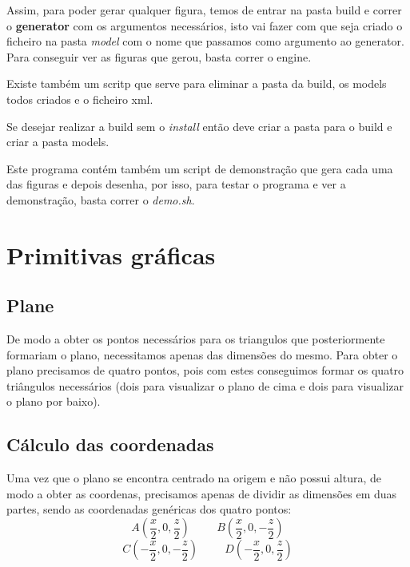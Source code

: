\Huge\documentclass{article}
\begin{document}
\vspace{0.5cm}

Assim, para poder gerar qualquer figura, temos de entrar na pasta build e correr o \textbf{generator} com os argumentos necessários, isto vai fazer com que seja criado o ficheiro na pasta \textit{model} com o nome que passamos como argumento ao generator. Para conseguir ver as figuras que gerou, basta correr o engine.

\vspace{0.5cm}

Existe também um scritp  que serve para eliminar a pasta da build, os models todos criados e o ficheiro xml.

\vspace{0.5cm}

Se desejar realizar a build sem o \textit{install} então deve criar a pasta para o build e criar a pasta models.

\vspace{0.5cm}

Este programa contém também um script de demonstração que gera cada uma das figuras e depois desenha, por isso, para testar o programa e ver a demonstração, basta correr o \textit{demo.sh}.

\newpage

\section{Primitivas gráficas}

\subsection{Plane}
De modo a obter os pontos necessários para os triangulos que posteriormente formariam o plano, necessitamos apenas das dimensões do mesmo. 
Para obter o plano precisamos de quatro pontos, pois com estes conseguimos formar os quatro triângulos necessários (dois para visualizar o plano de cima e dois para visualizar o plano por baixo).

\subsection{Cálculo das coordenadas}
Uma vez que o plano se encontra centrado na origem e não possui altura, de modo a obter as coordenas, precisamos apenas de dividir as dimensões em duas partes, sendo as coordenadas genéricas dos quatro pontos:
\[A(\frac{x}{2}, 0, \frac{z}{2}) \hspace{1cm} B(\frac{x}{2}, 0, -\frac{z}{2})\]
\[C(-\frac{x}{2}, 0, -\frac{z}{2}) \hspace{1cm} D(-\frac{x}{2}, 0, \frac{z}{2})\]
\end{document}
